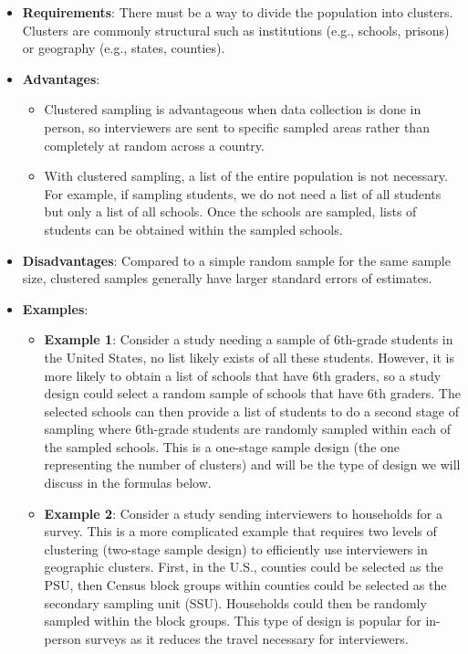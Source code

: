 \documentclass[
]{krantz}
\providecommand{\tightlist}{%
  \setlength{\itemsep}{0pt}\setlength{\parskip}{0pt}}
\begin{document}
\begin{itemize}
\tightlist
\item
  \textbf{Requirements}: There must be a way to divide the population into clusters. Clusters are commonly structural such as institutions (e.g., schools, prisons) or geography (e.g., states, counties).
\item
  \textbf{Advantages}:

  \begin{itemize}
  \tightlist
  \item
    Clustered sampling is advantageous when data collection is done in person, so interviewers are sent to specific sampled areas rather than completely at random across a country.
  \item
    With clustered sampling, a list of the entire population is not necessary. For example, if sampling students, we do not need a list of all students but only a list of all schools. Once the schools are sampled, lists of students can be obtained within the sampled schools.
  \end{itemize}
\item
  \textbf{Disadvantages}: Compared to a simple random sample for the same sample size, clustered samples generally have larger standard errors of estimates.
\item
  \textbf{Examples}:

  \begin{itemize}
  \tightlist
  \item
    \textbf{Example 1}: Consider a study needing a sample of 6th-grade students in the United States, no list likely exists of all these students. However, it is more likely to obtain a list of schools that have 6th graders, so a study design could select a random sample of schools that have 6th graders. The selected schools can then provide a list of students to do a second stage of sampling where 6th-grade students are randomly sampled within each of the sampled schools. This is a one-stage sample design (the one representing the number of clusters) and will be the type of design we will discuss in the formulas below.
  \item
    \textbf{Example 2}: Consider a study sending interviewers to households for a survey. This is a more complicated example that requires two levels of clustering (two-stage sample design) to efficiently use interviewers in geographic clusters. First, in the U.S., counties could be selected as the PSU, then Census block groups within counties could be selected as the secondary sampling unit (SSU). Households could then be randomly sampled within the block groups. This type of design is popular for in-person surveys as it reduces the travel necessary for interviewers.
  \end{itemize}
\end{itemize}
\end{document}
